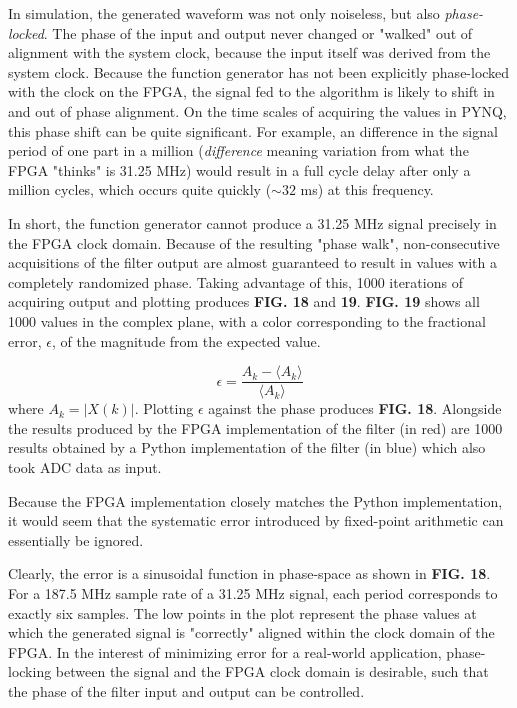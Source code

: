 \documentclass[reprint,amsmath,amssymb]{revtex4-2}
\begin{document}
In simulation, the generated waveform was not only noiseless, but also \textit{phase-locked}. The phase of the input and output never changed or "walked" out of alignment with the system clock, because the input itself was derived from the system clock. Because the function generator has not been explicitly phase-locked with the clock on the FPGA, the signal fed to the algorithm is likely to shift in and out of phase alignment. On the time scales of acquiring the values in PYNQ, this phase shift can be quite significant. For example, an difference in the signal period of one part in a million (\textit{difference} meaning variation from what the FPGA "thinks" is 31.25 MHz) would result in a full cycle delay after only a million cycles, which occurs quite quickly ($\sim 32$ ms) at this frequency.

In short, the function generator cannot produce a 31.25 MHz signal precisely in the FPGA clock domain. Because of the resulting "phase walk", non-consecutive acquisitions of the filter output are almost guaranteed to result in values with a completely randomized phase. Taking advantage of this, 1000 iterations of acquiring output and plotting produces \textbf{FIG. 18} and \textbf{19}. \textbf{FIG. 19} shows all 1000 values in the complex plane, with a color corresponding to the fractional error, $\epsilon$, of the magnitude from the expected value.

\begin{equation}
    \epsilon = \frac{A_k - \langle A_k \rangle}{\langle A_k \rangle}
\end{equation}
where $A_k = |X(k)|$. Plotting $\epsilon$ against the phase produces \textbf{FIG. 18}. Alongside the results produced by the FPGA implementation of the filter (in red) are 1000 results obtained by a Python implementation of the filter (in blue) which also took ADC data as input.

Because the FPGA implementation closely matches the Python implementation, it would seem that the systematic error introduced by fixed-point arithmetic can essentially be ignored.

Clearly, the error is a sinusoidal function in phase-space as shown in \textbf{FIG. 18}. For a 187.5 MHz sample rate of a 31.25 MHz signal, each period corresponds to exactly six samples. The low points in the plot represent the phase values at which the generated signal is "correctly" aligned within the clock domain of the FPGA. In the interest of minimizing error for a real-world application, phase-locking between the signal and the FPGA clock domain is desirable, such that the phase of the filter input and output can be controlled.
\end{document}
